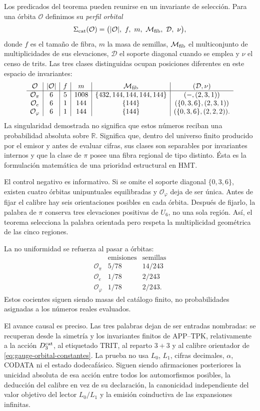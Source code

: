 Los predicados del teorema pueden reunirse en un invariante de selección.
Para una órbita \(\mathcal O\) definimos su \emph{perfil orbital}
\[
 \Sigma_{\rm cat}(\mathcal O)=
 \bigl(
 |\mathcal O|,\ f,\ m,\ \mathcal M_{\rm fib},\
 \mathcal D,\ \nu
 \bigr),
\]
donde \(f\) es el tamaño de fibra, \(m\) la masa de semillas,
\(\mathcal M_{\rm fib}\) el multiconjunto de multiplicidades de sus
elevaciones, \(\mathcal D\) el soporte diagonal cuando se emplea y \(\nu\)
el censo de trits. Las tres clases distinguidas ocupan posiciones diferentes
en este espacio de invariantes:
\[
\begin{array}{c|c|c|c|c|c}
\mathcal O&|\mathcal O|&f&m&\mathcal M_{\rm fib}&(\mathcal D,\nu)\\ \hline
\mathcal O_\pi&6&5&1008&\{432,144,144,144,144\}&(-,(2,3,1))\\
\mathcal O_e&6&1&144&\{144\}&(\{0,3,6\},(2,3,1))\\
\mathcal O_\varphi&6&1&144&\{144\}&(\{0,3,6\},(2,2,2)).
\end{array}
\]
La singularidad demostrada no significa que estos números reciban una
probabilidad absoluta sobre \(\mathbb R\). Significa que, dentro del universo
finito producido por el emisor y antes de evaluar cifras, sus clases son
separables por invariantes internos y que la clase de \(\pi\) posee una fibra
regional de tipo distinto. Ésta es la formulación matemática de una
prioridad estructural en HMT\@.

El control negativo es informativo. Si se omite el soporte diagonal
\(\{0,3,6\}\), existen cuatro órbitas unipuntuales equilibradas y
\(\mathcal O_\varphi\) deja de ser única. Antes de fijar el calibre hay seis
orientaciones posibles en cada órbita. Después de fijarlo, la palabra de
\(\pi\) conserva tres elevaciones positivas de \(U_6\), no una sola región.
Así, el teorema selecciona la palabra orientada pero respeta la multiplicidad
geométrica de las cinco regiones.

La no uniformidad se refuerza al pasar a órbitas:
\[
\begin{array}{c|cc}
&\text{emisiones}&\text{semillas}\\ \hline
\mathcal O_\pi&5/78&14/243\\
\mathcal O_e&1/78&2/243\\
\mathcal O_\varphi&1/78&2/243.
\end{array}
\]
Estos cocientes siguen siendo masas del catálogo finito, no probabilidades
asignadas a los números reales evaluados.

El avance causal es preciso. Las tres palabras dejan de ser entradas
nombradas: se recuperan desde la simetría y los invariantes finitos de
APP--TPK, relativamente a la acción \(D_3^{\rm cat}\), al etiquetado TRIT,
al reparto \(3+3\) y al calibre orientador de
\cref{eq:gauge-orbital-constantes}. La prueba no usa \(L_0\), \(L_1\),
cifras decimales, \(\alpha\), CODATA ni el estado dodecafásico. Siguen siendo
afirmaciones posteriores la unicidad absoluta de esa acción entre todos los
automorfismos posibles, la deducción del calibre en vez de su declaración, la
canonicidad independiente del valor objetivo del lector \(L_0/L_1\) y la emisión coinductiva de las
expansiones infinitas.

